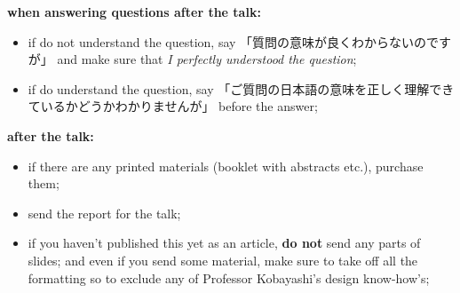 \documentclass[12pt]{article} %
\begin{document}
	\textbf{when answering questions after the talk:}
	\begin{itemize}
		\item if do not understand the question, say 「質問の意味が良くわからないのですが」 and make sure that \textit{I perfectly understood the question};
		\item if do understand the question, say 「ご質問の日本語の意味を正しく理解できているかどうかわかりませんが」 before the answer;
	\end{itemize}
	\textbf{after the talk:}
	\begin{itemize}
		\item if there are any printed materials (booklet with abstracts etc.), purchase them;
        \item send the report for the talk;
        \item if you haven't published this yet as an article, \textbf{do not} send any parts of slides;
            and even if you send some material, make sure to take off all the formatting so to exclude
            any of Professor Kobayashi's design know-how's;
	\end{itemize}
\end{document}
